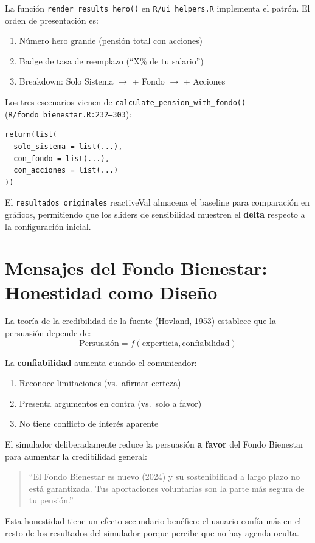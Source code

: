 \documentclass[11pt,a4paper]{report}
\begin{document}
\begin{tcolorbox}[colback=orange!5!white, colframe=orange!75!black, title=\textbf{Aplicaci\'on en C\'odigo: render\_results\_hero()}]
La funci\'on \texttt{render\_results\_hero()} en \texttt{R/ui\_helpers.R} implementa el patr\'on. El orden de presentaci\'on es:

\begin{enumerate}
  \item N\'umero hero grande (pensi\'on total con acciones)
  \item Badge de tasa de reemplazo (``X\% de tu salario'')
  \item Breakdown: Solo Sistema $\to$ + Fondo $\to$ + Acciones
\end{enumerate}

Los tres escenarios vienen de \texttt{calculate\_pension\_with\_fondo()} (\texttt{R/fondo\_bienestar.R:232--303}):
\begin{lstlisting}
return(list(
  solo_sistema = list(...),
  con_fondo = list(...),
  con_acciones = list(...)
))
\end{lstlisting}

El \texttt{resultados\_originales} reactiveVal almacena el baseline para comparaci\'on en gr\'aficos, permitiendo que los sliders de sensibilidad muestren el \textbf{delta} respecto a la configuraci\'on inicial.
\end{tcolorbox}


\section{Mensajes del Fondo Bienestar: Honestidad como Dise\~no}

\begin{tcolorbox}[colback=blue!5!white, colframe=blue!75!black, title=\textbf{Definici\'on Formal: Confianza y Credibilidad en Comunicaci\'on}]
La teor\'ia de la credibilidad de la fuente (Hovland, 1953) establece que la persuasi\'on depende de:
\[
  \text{Persuasi\'on} = f(\text{experticia}, \text{confiabilidad})
\]

La \textbf{confiabilidad} aumenta cuando el comunicador:
\begin{enumerate}
  \item Reconoce limitaciones (vs.\ afirmar certeza)
  \item Presenta argumentos en contra (vs.\ solo a favor)
  \item No tiene conflicto de inter\'es aparente
\end{enumerate}

El simulador deliberadamente reduce la persuasi\'on \textbf{a favor} del Fondo Bienestar para aumentar la credibilidad general:
\begin{quote}
``El Fondo Bienestar es nuevo (2024) y su sostenibilidad a largo plazo no est\'a garantizada. Tus aportaciones voluntarias son la parte m\'as segura de tu pensi\'on.''
\end{quote}

Esta honestidad tiene un efecto secundario ben\'efico: el usuario conf\'ia m\'as en el resto de los resultados del simulador porque percibe que no hay agenda oculta.
\end{tcolorbox}
\end{document}

